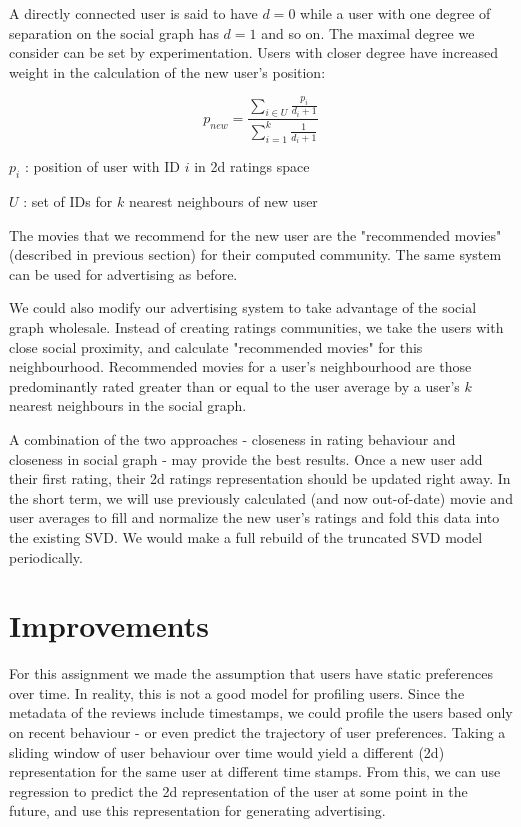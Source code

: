 \documentclass[11pt]{article}
\begin{document}
A directly connected user is said to have $d = 0$ while a user with one degree of separation on the social graph has $d = 1$ and so on. The maximal degree we consider can be set by experimentation. Users with closer degree have increased weight in the calculation of the new user's position:

\[
    p_{new} = \frac{\sum_{i\in U}\frac{p_{i}}{d_{i}+1}}{\sum_{i=1}^{k}\frac{1}{d_{i}+1}}
\]

$p_{i}$ : position of user with ID $i$ in 2d ratings space

$U$ : set of IDs for $k$ nearest neighbours of new user\newline

The movies that we recommend for the new user are the "recommended movies" (described in previous section) for their computed community. The same system can be used for advertising as before.\newline

We could also modify our advertising system to take advantage of the social graph wholesale. Instead of creating ratings communities, we take the users with close social proximity, and calculate "recommended movies" for this neighbourhood. Recommended movies for a user's neighbourhood are those predominantly rated greater than or equal to the user average by a user's $k$ nearest neighbours in the social graph.\newline

A combination of the two approaches - closeness in rating behaviour and closeness in social graph - may provide the best results. Once a new user add their first rating, their 2d ratings representation should be updated right away. In the short term, we will use previously calculated (and now out-of-date) movie and user averages to fill and normalize the new user's ratings and fold this data into the existing SVD. We would make a full rebuild of the truncated SVD model periodically.


\section{Improvements}

For this assignment we made the assumption that users have static preferences over time. In reality, this is not a good model for profiling users. Since the metadata of the reviews include timestamps, we could profile the users based only on recent behaviour - or even predict the trajectory of user preferences. Taking a sliding window of user behaviour over time would yield a different (2d) representation for the same user at different time stamps. From this, we can use regression to predict the 2d representation of the user at some point in the future, and use this representation for generating advertising.\newline
\end{document}
